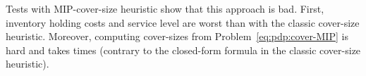 Tests with MIP-cover-size heuristic show that this approach is bad.
First, inventory holding costs and service level are worst than with the classic cover-size heuristic.
Moreover, computing cover-sizes from Problem~\eqref{eq:pdp:cover-MIP} is hard and takes times (contrary to the closed-form formula in the classic cover-size heuristic).

